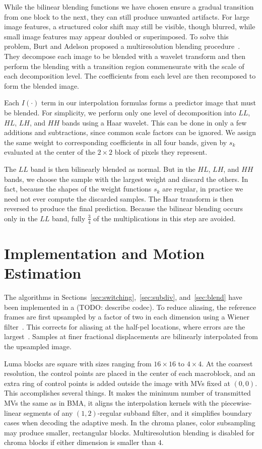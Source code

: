 \documentclass[11pt,letterpaper]{article}
\newcommand{\s}[1]{\ensuremath{{s_{#1}}}}
\begin{document}
While the bilinear blending functions we have chosen ensure a gradual
 transition from one block to the next, they can still produce unwanted
 artifacts.
For large image features, a structured color shift may still be visible, though
 blurred, while small image features may appear doubled or superimposed.
To solve this problem, Burt and Adelson proposed a multiresolution blending
 procedure~\cite{BA83}.
They decompose each image to be blended with a wavelet transform and then
 perform the blending with a transition region commensurate with the scale of
 each decomposition level.
The coefficients from each level are then recomposed to form the blended image.

Each $I(\cdot)$ term in our interpolation formulas forms a predictor image that
 must be blended.
For simplicity, we perform only one level of decomposition into $LL$, $HL$,
 $LH$, and $HH$ bands using a Haar wavelet.
This can be done in only a few additions and subtractions, since common scale
 factors can be ignored.
We assign the same weight to corresponding coefficients in all four bands,
 given by $\s k$ evaluated at the center of the $2\times 2$ block of pixels
 they represent.

The $LL$ band is then bilinearly blended as normal.
But in the $HL$, $LH$, and $HH$ bands, we choose the sample with the largest
 weight and discard the others.
In fact, because the shapes of the weight functions $\s k$ are regular, in
 practice we need not ever compute the discarded samples.
The Haar transform is then reversed to produce the final prediction.
Because the bilinear blending occurs only in the $LL$ band, fully $\frac{3}{4}$
 of the multiplications in this step are avoided.

\section{Implementation and Motion Estimation}

The algorithms in Sections~\ref{sec:switching},~\ref{sec:subdiv},
 and~\ref{sec:blend} have been implemented in a (TODO: describe codec).
To reduce aliasing, the reference frames are first upsampled by a factor of
 two in each dimension using a Wiener filter~\cite{Wer96}.
This corrects for aliasing at the half-pel locations, where errors are the
 largest~\cite{WM03}.
Samples at finer fractional displacements are bilinearly interpolated from the
 upsampled image.

Luma blocks are square with sizes ranging from $16\times 16$ to $4\times 4$.
At the coarsest resolution, the control points are placed in the center of each
 macroblock, and an extra ring of control points is added outside the image
 with MVs fixed at $(0,0)$.
This accomplishes several things.
It makes the minimum number of transmitted MVs the same as in BMA, it aligns
 the interpolation kernels with the piecewise-linear segments of any
 $(1,2)$-regular subband filter, and it simplifies boundary cases when decoding
 the adaptive mesh.
In the chroma planes, color subsampling may produce smaller, rectangular
 blocks.
Multiresolution blending is disabled for chroma blocks if either dimension is
 smaller than $4$.
\end{document}

